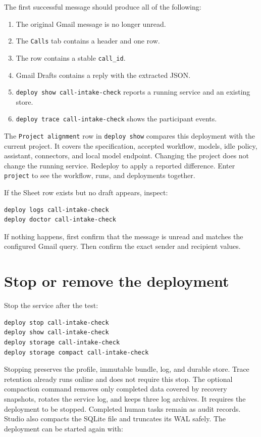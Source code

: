 \documentclass[11pt,a4paper]{article}
\begin{document}
The first successful message should produce all of the following:

\begin{enumerate}
  \item The original Gmail message is no longer unread.
  \item The \texttt{Calls} tab contains a header and one row.
  \item The row contains a stable \texttt{call\_id}.
  \item Gmail Drafts contains a reply with the extracted JSON.
  \item \texttt{deploy show call-intake-check} reports a running service and
        an existing store.
  \item \texttt{deploy trace call-intake-check} shows the participant events.
\end{enumerate}

The \texttt{Project alignment} row in \texttt{deploy show} compares this
deployment with the current project. It covers the specification, accepted
workflow, models, idle policy, assistant, connectors, and local model
endpoint. Changing the project does not change the running service. Redeploy
to apply a reported difference. Enter \texttt{project} to see the workflow,
runs, and deployments together.

If the Sheet row exists but no draft appears, inspect:

\begin{lstlisting}[style=shell]
deploy logs call-intake-check
deploy doctor call-intake-check
\end{lstlisting}

If nothing happens, first confirm that the message is unread and matches the
configured Gmail query. Then confirm the exact sender and recipient values.

\section{Stop or remove the deployment}

Stop the service after the test:

\begin{lstlisting}[style=shell]
deploy stop call-intake-check
deploy show call-intake-check
deploy storage call-intake-check
deploy storage compact call-intake-check
\end{lstlisting}

Stopping preserves the profile, immutable bundle, log, and durable store.
Trace retention already runs online and does not require this stop. The
optional compaction command removes only completed data covered by recovery
snapshots, rotates the service log, and keeps three log archives. It requires
the deployment to be stopped. Completed human tasks remain as audit records.
Studio also compacts the SQLite file and truncates its WAL safely.
The deployment can be started again with:
\end{document}
